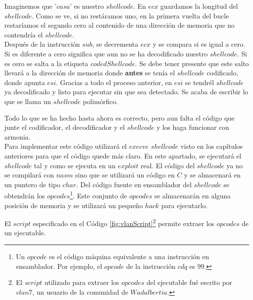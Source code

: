 \documentclass [titlepage, 12pt]{article}
\begin{document}
Imaginemos que '$casa$' es nuestro $shellcode$. En $ecx$ guardamos la longitud del $shellcode$. Como se ve, si no rest\'aramos uno, en la primera vuelta del bucle restar\'iamos el segundo cero al contenido de una direcci\'on de memoria que no contendr\'ia el $shellcode$.\\
Despu\'es de la instrucci\'on $sub$, se decrementa $ecx$ y se compara si es igual a cero. Si es diferente a cero significa que aun no se ha decodificado nuestro $shellcode$. Si es cero se salta a la etiqueta $codedShellcode$. Se debe tener presente que este salto llevar\'a a la direcci\'on de memoria donde \textbf{antes} se ten\'ia el $shellcode$ codificado, donde apunta $esi$. Gracias a todo el proceso anterior, en $esi$ se tendr\' el $shellcode$ ya decodificado y listo para ejecutar sin que sea detectado. Se acaba de escribir lo que se llama un $shellcode$ polim\'orfico.\bigskip

Todo lo que se ha hecho hasta ahora es correcto, pero aun falta el c\'odigo que junte el codificador, el decodificador y el $shellcode$ y los haga funcionar con armonia.\\
Para implementar este c\'odigo utilizar\'a el $execve$ $shellcode$ visto en los cap\'itulos anteriores para que el c\'odigo quede m\'as claro. En este apartado, se ejecutar\'a el $shellcode$ tal y como se ejecuta en un $exploit$ real. El c\'odigo del $shellcode$ ya no se compilar\'a con $nasm$ sino que se utilizar\'a un c\'odigo en $C$ y se almacenar\'a en un puntero de tipo $char$. Del c\'odigo fuente en ensamblador del $shellcode$ se obtendr\'an los $opcodes$\footnote{Un $opcode$ es el c\'odigo m\'aquina equivalente a una instrucci\'on en ensamblador. Por ejemplo, el $opcode$ de la instrucci\'on $cdq$ es 99.}. Este conjunto de $opcodes$ se almacenar\'an en alguna posici\'on de memoria y se utilizar\'a un peque\~no $hack$ para ejecutarlo.\bigskip

El $script$ especificado en el C\'odigo \ref{fig:vlanScript}\footnote{El $script$ utilizado para extraer los $opcodes$ del ejecutable fu\'e escrito por $vlan7$, un usuario de la comunidad de $Wadalbertia$.} permite extraer los $opcodes$ de un ejecutable. \\
\end{document}
